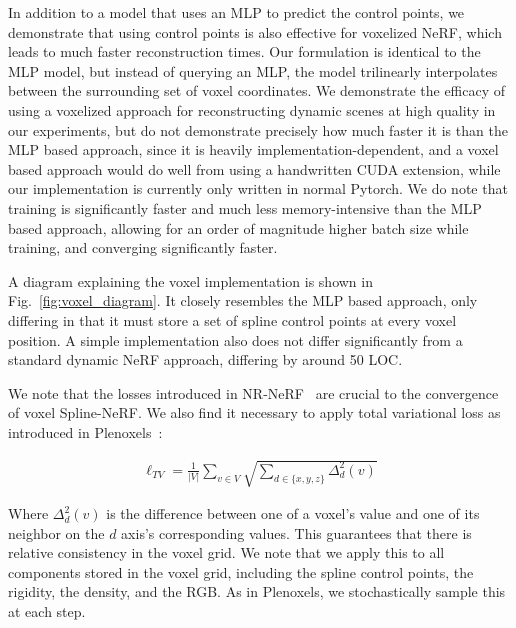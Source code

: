 In addition to a model that uses an MLP to predict the control points, we demonstrate that using control points is also effective for voxelized NeRF, which leads to much faster reconstruction times. Our formulation is identical to the MLP model, but instead of querying an MLP, the model trilinearly interpolates between the surrounding set of voxel coordinates. We demonstrate the efficacy of using a voxelized approach for reconstructing dynamic scenes at high quality in our experiments, but do not demonstrate precisely how much faster it is than the MLP based approach, since it is heavily implementation-dependent, and a voxel based approach would do well from using a handwritten CUDA extension, while our implementation is currently only written in normal Pytorch. We do note that training is significantly faster and much less memory-intensive than the MLP based approach, allowing for an order of magnitude higher batch size while training, and converging significantly faster.

A diagram explaining the voxel implementation is shown in Fig.~\ref{fig:voxel_diagram}. It closely resembles the MLP based approach, only differing in that it must store a set of spline control points at every voxel position. A simple implementation also does not differ significantly from a standard dynamic NeRF approach, differing by around 50 LOC.

We note that the losses introduced in NR-NeRF~\cite{tretschk2021nonrigid} are crucial to the convergence of voxel Spline-NeRF. We also find it necessary to apply total variational loss as introduced in Plenoxels~\cite{yu2021plenoxels}:

\begin{align}
    \ell_{TV} = \frac{1}{|V|} \sum_{v\in V} \sqrt{\sum_{d\in \{x,y,z\}} \Delta^2_d(v)}
\end{align}

Where $\Delta^2_d(v)$ is the difference between one of a voxel's value and one of its neighbor on the $d$ axis's corresponding values. This guarantees that there is relative consistency in the voxel grid. We note that we apply this to all components stored in the voxel grid, including the spline control points, the rigidity, the density, and the RGB. As in Plenoxels, we stochastically sample this at each step.